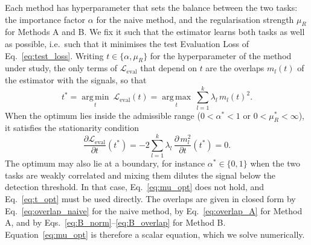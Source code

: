 Each method has    hyperparameter that sets the balance between the two tasks: the importance factor $\alpha$ for the naive method, and the regularisation strength $\mu_R$ for Methods A and B. We fix it such that the estimator learns both tasks as well as possible, i.e.\ such that it minimises the test Evaluation Loss of Eq.~\eqref{eq:test_loss}. Writing $t \in \{\alpha, \mu_R\}$ for the hyperparameter of the method under study, the only terms of $\mathcal L_{\mathrm{eval}}$ that depend on $t$ are the overlaps $m_l(t)$ of the estimator with the signals, so that
\begin{equation}
    t^* = \operatorname*{arg\,min}_{t}\ \mathcal L_{\mathrm{eval}}(t)
    = \operatorname*{arg\,max}_{t}\ \sum_{l=1}^{k}\lambda_l\, m_l(t)^2 .
    \label{eq:t_opt}
\end{equation}
When the optimum lies inside the admissible range ($0 < \alpha^* < 1$ or $0 < \mu_R^* < \infty$), it satisfies the stationarity condition
\begin{equation}
    \frac{\partial\mathcal L_{\mathrm{eval}}}{\partial t}(t^*)
    = -2\sum_{l=1}^{k}\lambda_l\,\frac{\partial\, m_l^2}{\partial t}(t^*) = 0 .
    \label{eq:mu_opt}
\end{equation}
The optimum may also lie at a boundary, for instance $\alpha^* \in \{0, 1\}$ when the two tasks are weakly correlated and mixing them dilutes the signal below the detection threshold. In that case, Eq.~\eqref{eq:mu_opt} does not hold, and Eq.~\eqref{eq:t_opt} must be used directly. The overlaps are given in closed form by Eq.~\eqref{eq:overlap_naive} for the naive method, by Eq.~\eqref{eq:overlap_A} for Method A, and by Eqs.~\eqref{eq:B_norm}--\eqref{eq:B_overlap} for Method B. Equation~\eqref{eq:mu_opt} is therefore a scalar equation, which we solve numerically.

